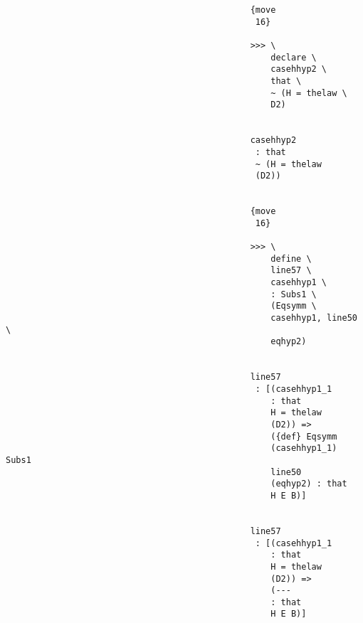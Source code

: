 \documentclass[12pt]{article}
\begin{document}
\begin{verbatim}
                                                {move 
                                                 16}

                                                >>> \
                                                    declare \
                                                    casehhyp2 \
                                                    that \
                                                    ~ (H = thelaw \
                                                    D2)


                                                casehhyp2 
                                                 : that 
                                                 ~ (H = thelaw 
                                                 (D2))


                                                {move 
                                                 16}

                                                >>> \
                                                    define \
                                                    line57 \
                                                    casehhyp1 \
                                                    : Subs1 \
                                                    (Eqsymm \
                                                    casehhyp1, line50 \
                                                    eqhyp2)


                                                line57 
                                                 : [(casehhyp1_1 
                                                    : that 
                                                    H = thelaw 
                                                    (D2)) => 
                                                    ({def} Eqsymm 
                                                    (casehhyp1_1) Subs1 
                                                    line50 
                                                    (eqhyp2) : that 
                                                    H E B)]


                                                line57 
                                                 : [(casehhyp1_1 
                                                    : that 
                                                    H = thelaw 
                                                    (D2)) => 
                                                    (--- 
                                                    : that 
                                                    H E B)]



\end{verbatim}
\end{document}
